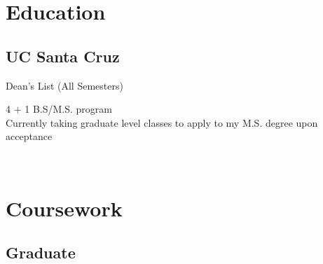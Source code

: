 \documentclass[letterpaper]{deedy-resume} %
\begin{document}




\begin{minipage}[t]{0.30\textwidth} %


\section{Education} 

\subsection{UC Santa Cruz }

Dean's List (All Semesters) \\
\sectionspace

4 $+$ 1 B.S/M.S. program\\
Currently taking graduate level classes to apply to my M.S. degree upon acceptance 
\sectionspace %


\

\section{Coursework}

\subsection{Graduate}


\end{minipage}
\end{document}
